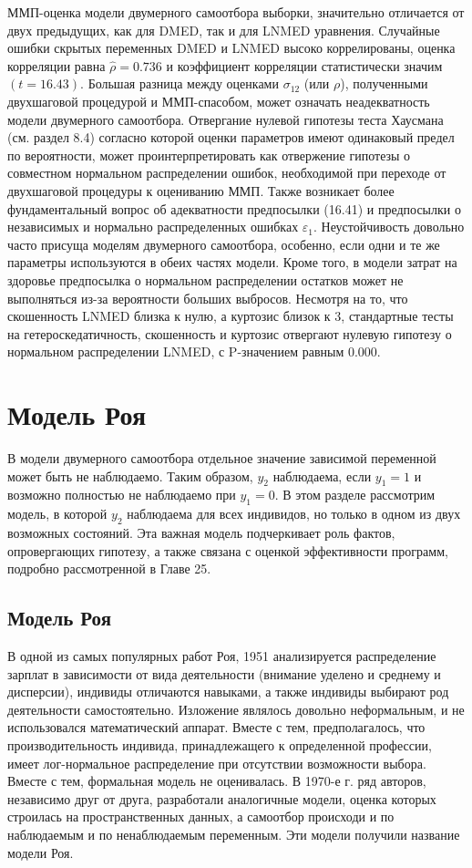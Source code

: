 ММП-оценка модели двумерного самоотбора выборки, значительно отличается от двух предыдущих, как для DMED, так и для LNMED уравнения. Случайные ошибки скрытых переменных DMED и LNMED высоко коррелированы, оценка корреляции  равна  $\hat{\rho}=0.736$ и коэффициент корреляции статистически значим $(t=16.43)$. 
Большая разница между оценками $\sigma_{12}$ (или $\rho$), полученными двухшаговой процедурой и ММП-спасобом, может означать неадекватность модели двумерного самоотбора. Отвергание нулевой гипотезы теста Хаусмана (см. раздел 8.4) согласно которой оценки параметров имеют одинаковый предел по вероятности, может проинтерпретировать как отвержение гипотезы о совместном нормальном распределении ошибок, необходимой при переходе от двухшаговой процедуры к оцениванию ММП. 
Также возникает более фундаментальный вопрос об адекватности предпосылки (16.41) и предпосылки о независимых и нормально распределенных ошибках $\varepsilon_1$. Неустойчивость довольно часто присуща моделям двумерного самоотбора, особенно, если одни и те же параметры используются в обеих частях модели. Кроме того, в модели затрат на здоровье предпосылка о нормальном распределении остатков может не выполняться из-за вероятности больших выбросов. Несмотря на то, что скошенность LNMED близка к нулю, а куртозис близок к $3$, стандартные тесты на гетероскедатичность, скошенность и куртозис отвергают нулевую гипотезу о нормальном распределении LNMED, с P-значением равным 0.000.


\section{Модель Роя}


В модели двумерного самоотбора отдельное значение зависимой переменной может быть не наблюдаемо. Таким образом,  $y_2$ наблюдаема, если $y_1=1$ и возможно полностью не наблюдаемо при $y_1=0$. В этом разделе рассмотрим модель, в которой $y_2$ наблюдаема для всех индивидов, но только в одном из двух возможных состояний. Эта важная модель подчеркивает роль фактов, опровергающих гипотезу, а также связана с оценкой эффективности программ, подробно рассмотренной в Главе 25. 

\subsection{Модель Роя}

В одной из самых популярных работ Роя, 1951 анализируется распределение зарплат в зависимости от вида деятельности (внимание уделено и среднему и дисперсии), индивиды отличаются навыками, а также индивиды выбирают род деятельности самостоятельно. Изложение являлось довольно неформальным, и не использовался математический аппарат. Вместе с тем, предполагалось, что производительность индивида, принадлежащего к определенной профессии, имеет лог-нормальное распределение при отсутствии возможности выбора. Вместе с тем, формальная модель не оценивалась. В 1970-е г. ряд авторов, независимо друг от друга, разработали аналогичные модели, оценка которых строилась на пространственных данных, а самоотбор происходи и по наблюдаемым и по ненаблюдаемым переменным. Эти модели получили название модели Роя. 

